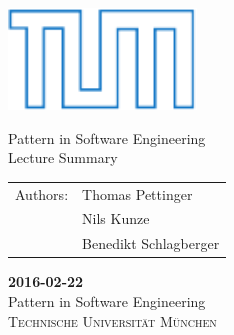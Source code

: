 \documentclass{article}
\begin{document}
\setcounter{tocdepth}{3}

\begin{titlepage}
  \centering\includegraphics[width=5cm]{tumlogo}

  \vspace{2.5cm}
  \Huge{Pattern in Software Engineering} \\
  \vspace{0.1in}\huge{Lecture Summary}\\

  \Large
  \vspace{1.5cm}
  \begin{tabularx}{9cm}{r l}
    Authors: & Thomas Pettinger \\
    & Nils Kunze\\
    & Benedikt Schlagberger\\
  \end{tabularx}

  \vfill
  \textbf{2016-02-22} \\
  \vspace{0.3in}\normalsize{Pattern in Software Engineering}\\
  \vspace{0.03in}\normalsize{\textsc{Technische Universität München}}\\
  \vspace{1cm}

\end{titlepage}


\newpage
\thispagestyle{empty}
\tableofcontents

\newpage
{}






\end{document}
